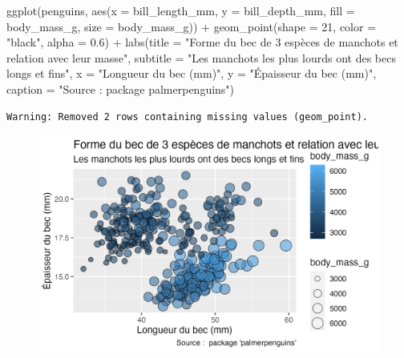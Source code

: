 \documentclass[
  letterpaper,
  DIV=11,
  numbers=noendperiod]{scrreprt}
\newenvironment{Shaded}{\begin{snugshade}}{\end{snugshade}}
\newcommand{\AttributeTok}[1]{\textcolor[rgb]{0.40,0.45,0.13}{#1}}
\newcommand{\DecValTok}[1]{\textcolor[rgb]{0.68,0.00,0.00}{#1}}
\newcommand{\FloatTok}[1]{\textcolor[rgb]{0.68,0.00,0.00}{#1}}
\newcommand{\FunctionTok}[1]{\textcolor[rgb]{0.28,0.35,0.67}{#1}}
\newcommand{\NormalTok}[1]{\textcolor[rgb]{0.00,0.23,0.31}{#1}}
\newcommand{\SpecialCharTok}[1]{\textcolor[rgb]{0.37,0.37,0.37}{#1}}
\newcommand{\StringTok}[1]{\textcolor[rgb]{0.13,0.47,0.30}{#1}}
\begin{document}
\begin{Shaded}
\begin{Highlighting}[]
\FunctionTok{ggplot}\NormalTok{(penguins, }\FunctionTok{aes}\NormalTok{(}\AttributeTok{x =}\NormalTok{ bill\_length\_mm, }\AttributeTok{y =}\NormalTok{ bill\_depth\_mm,}
                     \AttributeTok{fill =}\NormalTok{ body\_mass\_g, }\AttributeTok{size =}\NormalTok{ body\_mass\_g)) }\SpecialCharTok{+}
  \FunctionTok{geom\_point}\NormalTok{(}\AttributeTok{shape =} \DecValTok{21}\NormalTok{, }\AttributeTok{color =} \StringTok{"black"}\NormalTok{, }\AttributeTok{alpha =} \FloatTok{0.6}\NormalTok{) }\SpecialCharTok{+}
  \FunctionTok{labs}\NormalTok{(}\AttributeTok{title =} \StringTok{"Forme du bec de 3 espèces de manchots et relation avec leur masse"}\NormalTok{,}
       \AttributeTok{subtitle =} \StringTok{"Les manchots les plus lourds ont des becs longs et fins"}\NormalTok{,}
       \AttributeTok{x =} \StringTok{"Longueur du bec (mm)"}\NormalTok{,}
       \AttributeTok{y =} \StringTok{"Épaisseur du bec (mm)"}\NormalTok{,}
       \AttributeTok{caption =} \StringTok{"Source :  package \textquotesingle{}palmerpenguins\textquotesingle{}"}\NormalTok{)}
\end{Highlighting}
\end{Shaded}

\begin{verbatim}
Warning: Removed 2 rows containing missing values (geom_point).
\end{verbatim}

\begin{figure}[H]

{\centering \includegraphics{./03-visualization_files/figure-pdf/unnamed-chunk-88-1.png}

}

\end{figure}
\end{document}
